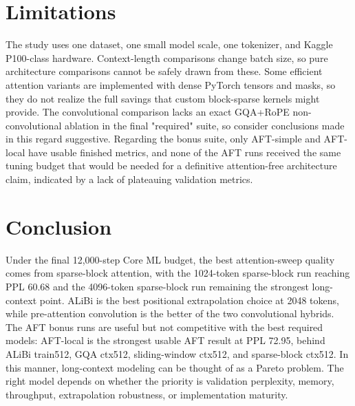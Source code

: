 \documentclass[11pt]{article}
\begin{document}
\section{Limitations}
The study uses one dataset, one small model scale, one tokenizer, and Kaggle P100-class hardware. Context-length comparisons change batch size, so pure architecture comparisons cannot be safely drawn from these. Some efficient attention variants are implemented with dense PyTorch tensors and masks, so they do not realize the full savings that custom block-sparse kernels might provide. The convolutional comparison lacks an exact GQA+RoPE non-convolutional ablation in the final "required" suite, so consider conclusions made in this regard suggestive. Regarding the bonus suite, only AFT-simple and AFT-local have usable finished metrics, and none of the AFT runs received the same tuning budget that would be needed for a definitive attention-free architecture claim, indicated by a lack of plateauing validation metrics.

\section{Conclusion}
Under the final 12,000-step Core ML budget, the best attention-sweep quality comes from sparse-block attention, with the 1024-token sparse-block run reaching PPL 60.68 and the 4096-token sparse-block run remaining the strongest long-context point. ALiBi is the best positional extrapolation choice at 2048 tokens, while pre-attention convolution is the better of the two convolutional hybrids. The AFT bonus runs are useful but not competitive with the best required models: AFT-local is the strongest usable AFT result at PPL 72.95, behind ALiBi train512, GQA ctx512, sliding-window ctx512, and sparse-block ctx512. In this manner, long-context modeling can be thought of as a Pareto problem. The right model depends on whether the priority is validation perplexity, memory, throughput, extrapolation robustness, or implementation maturity.

\appendix
\end{document}
